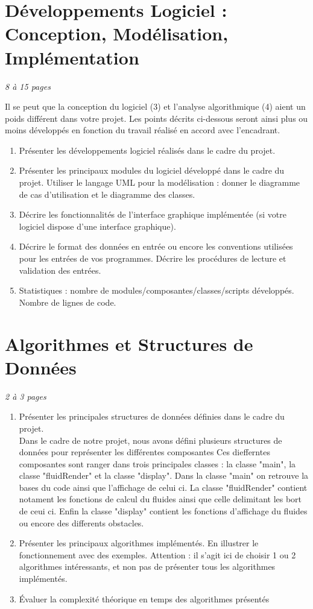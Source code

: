 \documentclass[a4paper]{article}
\begin{document}
\section{Développements Logiciel : Conception, Modélisation, Implémentation} 
\emph{8 à 15 pages}

Il se peut que la conception du logiciel (3) et l'analyse algorithmique (4) aient un poids différent dans votre projet. Les points décrits ci-dessous seront ainsi plus ou moins développés en fonction du travail réalisé en accord avec l'encadrant. 
\begin{enumerate}%
\item Présenter les développements logiciel réalisés dans le cadre du projet.\\
\item Présenter les principaux modules du logiciel développé dans le cadre du projet. Utiliser le langage UML pour la modélisation : donner le diagramme de cas d'utilisation et le diagramme des classes.
\item Décrire les fonctionnalités de l'interface graphique implémentée (si votre logiciel dispose d'une interface graphique).
\item Décrire le format des données en entrée ou encore les conventions utilisées pour les entrées de vos programmes. Décrire les procédures de lecture et validation des entrées.
\item Statistiques : nombre de modules/composantes/classes/scripts développés. Nombre de lignes de code.
\end{enumerate}

\section{Algorithmes et Structures de Données}
\emph{2 à 3 pages}
\begin{enumerate}%
\item 	Présenter les principales structures de données définies dans le cadre du projet.\\
      Dans le cadre de notre projet, nous avons défini plusieurs structures de données pour représenter les différentes composantes
      Ces diefferntes composantes sont ranger dans trois principales classes : 
      la classe "main", la classe "fluidRender" et la classe "display".
      Dans la classe "main" on retrouve la bases du code ainsi que l'affichage
      de celui ci.
      La classe "fluidRender" contient notament les fonctions de calcul du fluides
      ainsi que celle delimitant les bort de ceui ci.
      Enfin la classe "display" contient les fonctions d'affichage du fluides ou encore 
      des differents obstacles.
\item 	Présenter les principaux algorithmes implémentés. En illustrer le fonctionnement avec des exemples. Attention : il s'agit ici de choisir 1 ou 2 algorithmes intéressants, et non pas de présenter tous les algorithmes implémentés.
\item 	Évaluer la complexité théorique en temps des algorithmes présentés
\end{enumerate}
\end{document}
